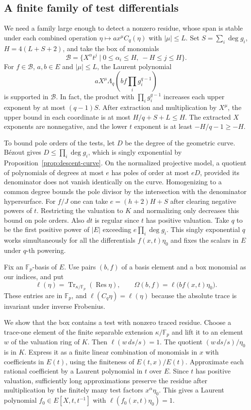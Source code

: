\subsection{A finite family of test differentials}

We need a family large enough to detect a nonzero residue, whose span
is stable under each combined operation $\eta\mapsto a x^\mu C_q(\eta)$
with $|\mu|\le L$. Set $S=\sum_i\deg g_i$, $H=4(L+S+2)$, and take
the box of monomials
\[
  \mathcal B=\{X^\alpha t^j\mid 0\le\alpha_i\le H,\ -H\le j\le H\}.
\]
For $f\in\mathcal B$, $a,b\in E$ and $|\mu|\le L$, the Laurent polynomial
\begin{equation}\label{eq:cartier-row}
       aX^\mu\Lambda_q\!\left(bf\prod_i g_i^{q-1}\right)
\end{equation}
is supported in $\mathcal B$. In fact, the product with
$\prod_i g_i^{q-1}$ increases each upper exponent by at most
$(q-1)S$. After extraction and multiplication by $X^\mu$, the upper
bound in each coordinate is at most $H/q+S+L\le H$. The extracted
$X$ exponents are nonnegative, and the lower $t$ exponent is at least
$-H/q-1\ge-H$.

To bound pole orders of the tests, let $D$ be the degree of the
geometric curve. B\'ezout gives $D\le\prod_i\deg g_i$, which is
singly exponential by Proposition~\ref{prop:descent-curve}. On the
normalized projective model, a quotient of polynomials of degrees at
most $e$ has poles of order at most $eD$, provided its denominator
does not vanish identically on the curve. Homogenizing to a common
degree bounds the pole divisor by the intersection with the
denominator hypersurface. For $f/J$ one can take $e=(h+2)H+S$
after clearing negative powers of $t$. Restricting the valuation
to $K$ and normalizing only decreases this bound on pole orders.
Also $dt$ is regular since $t$ has positive valuation. Take $q$
to be the first positive power of $|E|$ exceeding $e\prod_i\deg g_i$.
This singly exponential $q$ works simultaneously for all the differentials
$f(x,t)\eta_0$ and fixes the scalars in $E$ under $q$-th powering.

Fix an $\mathbb F_p$-basis of $E$. Use pairs $(b,f)$ of a basis
element and a box monomial as our indices, and put
\[
 \ell(\eta)=\operatorname{Tr}_{\kappa/\mathbb F_p}(\operatorname{Res}\eta),
 \qquad \Omega(b,f)=\ell\bigl(bf(x,t)\eta_0\bigr).
\]
These entries are in $\mathbb F_p$, and $\ell(C_q\eta)=\ell(\eta)$
because the absolute trace is invariant under inverse Frobenius.

We show that the box contains a test with nonzero traced residue.
Choose a trace-one element of the finite separable extension
$\kappa/\mathbb F_p$ and lift it to an element $w$ of the valuation
ring of $K$. Then $\ell(w\,ds/s)=1$. The quotient
$(w\,ds/s)/\eta_0$ is in $K$. Express it as a finite linear combination
of monomials in $x$ with coefficients in $E(t)$, using the finiteness
of $E(t,x)/E(t)$. Approximate each rational coefficient by a Laurent
polynomial in $t$ over $E$. Since $t$ has positive valuation, sufficiently
long approximations preserve the residue after multiplication by the
finitely many test factors $x^\alpha\eta_0$. This gives a Laurent
polynomial $f_0\in E[X,t,t^{-1}]$ with $\ell(f_0(x,t)\eta_0)=1$.

